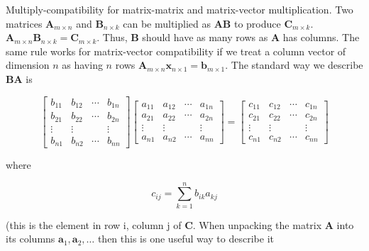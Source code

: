 \documentclass[main.tex]{subfiles}
\begin{document}
    Multiply-compatibility for matrix-matrix and matrix-vector multiplication. Two matrices $\mathbf{A}_{m \times n}$ and $\mathbf{B}_{n \times k}$ can be multiplied as $\mathbf{A B}$ to produce $\mathbf{C}_{m \times k}$. $\mathbf{A}_{m \times n} \mathbf{B}_{n \times k}=\mathbf{C}_{m \times k}$. Thus, $\mathbf{B}$ should have as many rows as $\mathbf{A}$ has columns. The same rule works for matrix-vector compatibility if we treat a column vector of dimension $n$ as having $n$ rows $\mathbf{A}_{m \times n} \mathbf{x}_{n \times 1}=\mathbf{b}_{m \times 1}$. The standard way we describe $\mathbf{B A}$ is 

    $$
    \left[\begin{array}{cccc}
    b_{11} & b_{12} & \cdots & b_{1 n} \\
    b_{21} & b_{22} & \cdots & b_{2 n} \\
    \vdots & \vdots & & \vdots \\
    b_{n 1} & b_{n 2} & \cdots & b_{n n}
    \end{array}\right]\left[\begin{array}{cccc}
    a_{11} & a_{12} & \cdots & a_{1 n} \\
    a_{21} & a_{22} & \cdots & a_{2 n} \\
    \vdots & \vdots & & \vdots \\
    a_{n 1} & a_{n 2} & \cdots & a_{n n}
    \end{array}\right]=\left[\begin{array}{cccc}
    c_{11} & c_{12} & \cdots & c_{1 n} \\
    c_{21} & c_{22} & \cdots & c_{2 n} \\
    \vdots & \vdots & & \vdots \\
    c_{n 1} & c_{n 2} & \cdots & c_{n n}
    \end{array}\right]
    $$    

    where 
    
    $$c_{i j}=\sum_{k=1}^{n} b_{i k} a_{k j}$$
    
    (this is the element in row i, column j of $\mathbf{C}$. When unpacking the matrix $\mathbf{A}$ into its columns $\mathbf{a}_{1}, \mathbf{a}_{2}, \ldots$ then this is one useful way to describe it
    
\end{document}
